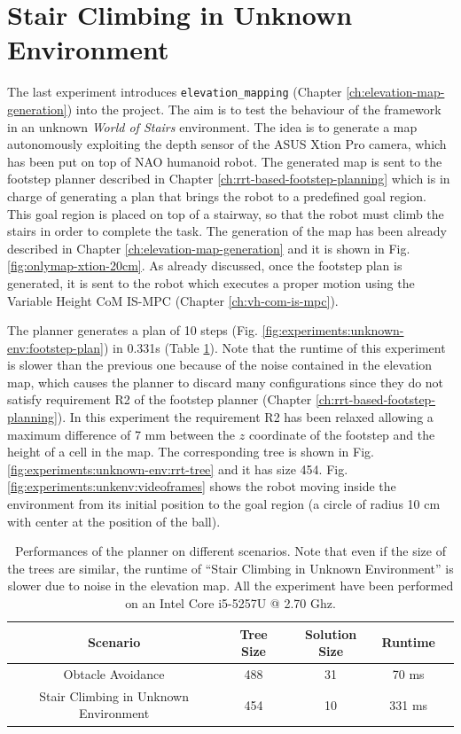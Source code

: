 \section{Stair Climbing in Unknown Environment}
\label{sec:stair-climbing-unkenv}
The last experiment introduces \texttt{elevation\_mapping} (Chapter 
\ref{ch:elevation-map-generation}) into the project. The aim is to test the 
behaviour of the framework in an unknown \textit{World of Stairs} environment.
The idea is to generate a map autonomously exploiting the depth sensor of the 
ASUS Xtion Pro camera, which has been put on top of NAO humanoid robot.
The generated map is sent to the footstep planner described in Chapter 
\ref{ch:rrt-based-footstep-planning} which is in charge of generating a 
plan that brings the robot to a predefined goal region. This goal region is 
placed on top of a stairway, so that the robot must climb the stairs in order 
to complete the task. The generation of the map has been already described in 
Chapter \ref{ch:elevation-map-generation} and it is shown in Fig. 
\ref{fig:onlymap-xtion-20cm}. As already discussed, once the footstep plan 
is generated, it is sent to the robot which executes a proper motion 
using the Variable Height CoM IS-MPC (Chapter \ref{ch:vh-com-is-mpc}).

The planner generates a plan of 10 steps (Fig.
\ref{fig:experiments:unknown-env:footstep-plan}) in 0.331s (Table
\ref{table:rrt-stats}). Note that the runtime of this experiment is slower
than the previous one because of the noise contained in the elevation map, 
which causes the planner to discard many configurations since they do not
satisfy requirement R2 of the footstep planner
(Chapter \ref{ch:rrt-based-footstep-planning}). In this experiment the 
requirement R2 has been relaxed allowing a maximum difference of 7 mm between
the $z$ coordinate of the footstep and the height of a cell in the map.
The corresponding 
tree is shown in Fig. \ref{fig:experiments:unknown-env:rrt-tree} and it has 
size 454. Fig. \ref{fig:experiments:unkenv:videoframes} shows the robot moving
inside the environment from its initial position
to the goal region (a circle of radius 10 cm with center at the position
of the ball).

\begin{table}
	\centering
	\begin{tabular}{*{5}{c}}
    Scenario & Tree Size & Solution Size & Runtime\\
		\hline
    Obtacle Avoidance & 488 & 31 & 70 ms \\
    Stair Climbing in Unknown Environment & 454 & 10 & 331 ms
	\end{tabular}
  \caption{Performances of the planner on different scenarios. Note that
	    even if the size of the trees are similar, the runtime of ``Stair
			Climbing in Unknown Environment'' is slower due to noise in the 
			elevation map. All the 
      experiment have been performed on an Intel Core i5-5257U @ 2.70 Ghz.}
	\label{table:rrt-stats}
\end{table}


